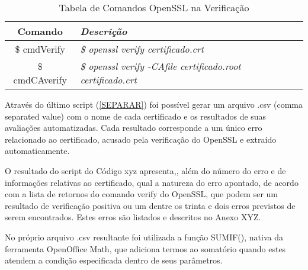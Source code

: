 	    \begin{table}[h]
			\centering
			\caption{Tabela de Comandos OpenSSL na Verificação}
			\label{tab:cmds02}
			\begin{tabular}{c>{\em}l}
			\toprule
			\textbf{Comando} & \textbf{Descrição} \\ \midrule
			\$ cmdVerify & \$ openssl verify certificado.crt \\ 
			\rowcolor[gray]{0.9}
			\$ cmdCAverify & \$ openssl verify -CAfile certificado.root certificado.crt \\
			\bottomrule
			\end{tabular}
		\end{table}
	    Através do último script (\ref{SEPARAR}) foi possível gerar um arquivo .csv (comma separated value) com o nome de cada certificado e os resultados de suas avaliações automatizadas. Cada resultado corresponde a um único erro relacionado ao certificado, acusado pela verificação do OpenSSL e extraído automaticamente.

    	O resultado do script do Código xyz apresenta,, além do número do erro e de informações relativas ao certificado, qual a natureza do erro apontado, de acordo com a lista de retornos do comando verify do OpenSSL, que podem ser um resultado de verificação positiva ou um dentre os trinta e dois erros previstos de serem encontrados. Estes erros são listados e descritos no Anexo XYZ.

    	No próprio arquivo .csv resultante foi utilizada a função SUMIF(), nativa da ferramenta OpenOffice Math, que adiciona termos ao somatório quando estes atendem a condição especificada dentro de seus parâmetros.